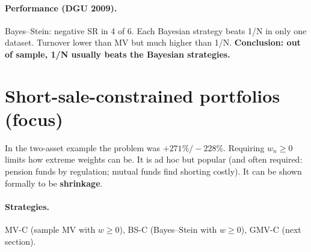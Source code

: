 \documentclass[11pt,a4paper]{report}
\begin{document}
\paragraph{Performance (DGU 2009).}
\begin{center}\small
{}
\end{center}
Bayes--Stein: negative SR in 4 of 6. Each Bayesian strategy beats 1/N in only one
dataset. Turnover lower than MV but much higher than 1/N.
\textbf{Conclusion: out of sample, 1/N usually beats the Bayesian strategies.}

\section{Short-sale-constrained portfolios (focus)}
In the two-asset example the problem was $+271\%/-228\%$. Requiring $w_n\ge0$
limits how extreme weights can be. It is ad hoc but popular (and often required:
pension funds by regulation; mutual funds find shorting costly). It can be shown
formally to be \textbf{shrinkage}.

\paragraph{Strategies.} MV-C (sample MV with $w\ge0$), BS-C (Bayes--Stein with
$w\ge0$), GMV-C (next section).
\end{document}
